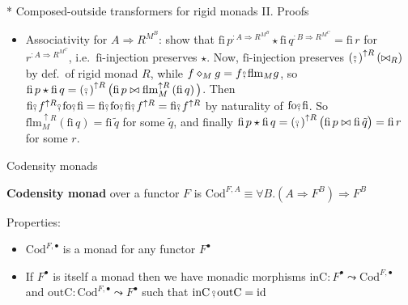 \documentclass[english]{beamer}
\newcommand{\bef}{\ensuremath\raisebox{2pt}{$\mathsmaller{\mathsmaller{\circ}}$}\hspace{-3.3pt},}
\begin{document}
\begin{frame}{{*} Composed-outside transformers for rigid monads II. Proofs}
\begin{itemize}
{use $(f^{\uparrow R}p)\bowtie_{R}q=\left(a\times b\Rightarrow f\left(a\right)\times b\right)^{\uparrow R}\left(p\bowtie_{R}q\right)$,
get $\diamond^{\uparrow R}\big(\big(\diamond^{\uparrow R}\left(p\bowtie q\right)\big)\bowtie r\big)=\diamond^{\uparrow R}\big(\big(\left(\left(a\times b\right)\times c\Rightarrow\left(a\diamond b\right)\times c\right)^{\uparrow R}\left(p\bowtie q\right)\big)\bowtie r\big)=\left(\left(a\times b\right)\times c\Rightarrow\left(a\diamond b\right)\diamond c\right)^{\uparrow R}\left(\left(p\bowtie q\right)\bowtie r\right)$
while the other order gives $\diamond^{\uparrow R}\big(p\bowtie\big(\diamond^{\uparrow R}\left(q\bowtie r\right)\big)\big)=\diamond^{\uparrow R}\big(\left(a\times\left(b\times c\right)\Rightarrow a\times\left(b\diamond c\right)\right)^{\uparrow R}\left(p\bowtie\left(q\bowtie r\right)\right)\big)=\left(a\times\left(b\times c\right)\Rightarrow a\diamond\left(b\diamond c\right)\right)^{\uparrow R}\left(p\bowtie\left(q\bowtie r\right)\right)$,
which is equivalent to the above.}{\footnotesize\par}
\item {\footnotesize{}\vspace{-0.1cm}Associativity for $A\Rightarrow R^{M^{B}}$:
show that $\text{fi}\,p^{:A\Rightarrow R^{M^{B}}}\star\text{fi}\,q^{:B\Rightarrow R^{M^{C}}}=\text{fi}\,r$
for $r^{:A\Rightarrow R^{M^{C}}}$, i.e.~$\text{fi}$-injection preserves
$\star$. Now, $\text{fi}$-injection preserves $\left(\bef\right)^{\uparrow R}\left(\bowtie_{R}\right)$
by def.~of rigid monad $R$, while $f\diamond_{M}g=f\bef\text{flm}_{M}g$,
so $\text{fi}\,p\star\text{fi}\,q=\left(\bef\right)^{\uparrow R}\big(\text{fi}\,p\bowtie\text{flm}_{M}^{\uparrow R}\left(\text{fi}\,q\right)\big)$.
Then $\text{fi}\bef f^{\uparrow R}\bef\text{fo}\bef\text{fi}=\text{fi}\bef\text{fo}\bef\text{fi}\bef f^{\uparrow R}=\text{fi}\bef f^{\uparrow R}$
by naturality of $\text{fo}\bef\text{fi}$. So $\text{flm}_{M}^{\uparrow R}\left(\text{fi}\,q\right)=\text{fi}\,\tilde{q}$
for some $\tilde{q}$, and finally $\text{fi}\,p\star\text{fi}\,q=\left(\bef\right)^{\uparrow R}\big(\text{fi}\,p\bowtie\text{fi}\,\tilde{q}\big)=\text{fi}\,r$
for some $r$.}{\footnotesize\par}
\end{itemize}
\end{frame}

\begin{frame}{Codensity monads}

\textbf{Codensity monad} over a functor $F$ is $\text{Cod}^{F,A}\equiv\forall B.\left(A\Rightarrow F^{B}\right)\Rightarrow F^{B}$

Properties:
\begin{itemize}
\item $\text{Cod}^{F,\bullet}$ is a monad for any functor $F^{\bullet}$
\item If $F^{\bullet}$ is itself a monad then we have monadic morphisms
$\text{inC}:F^{\bullet}\leadsto\text{Cod}^{F,\bullet}$ and $\text{outC}:\text{Cod}^{F,\bullet}\leadsto F^{\bullet}$
such that $\text{inC}\,\bef\text{outC}=\text{id}$
\end{itemize}
\end{frame}
\end{document}

